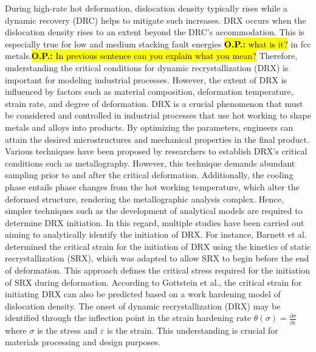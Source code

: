 \documentclass[metals,article,submit,pdftex,moreauthors]{Definitions/mdpi}
\makeatletter
\DeclareRobustCommand{\eal}{et al.\@\xspace}
\DeclareRobustCommand{\OP}[1]{\begingroup\sethlcolor{VWyellow}\textcolor{red}{\hl{\textbf{O.P.:} #1}}\endgroup}
\DeclareRobustCommand{\OPP}[1]{\begingroup\sethlcolor{VWyellow}\textcolor{red}{\hl{\textbf{O.P.:} In previous sentence #1}}\endgroup}
\makeatother
\begin{document}
During high-rate hot deformation, dislocation density typically rises while a dynamic recovery (DRC) helps to mitigate such increases.
DRX occurs when the dislocation density rises to an extent beyond the DRC’s accommodation.
This is especially true for low and medium stacking fault energies \OP{what is it?} in fcc metals.\OPP{can you explain what you mean?}
Therefore, understanding the critical conditions for dynamic recrystallization (DRX) is important for modeling industrial processes.
However, the extent of DRX is influenced by factors such as material composition, deformation temperature, strain rate, and degree of deformation.
DRX is a crucial phenomenon that must be considered and controlled in industrial processes that use hot working to shape metals and alloys into products.
By optimizing the parameters, engineers can attain the desired microstructures and mechanical properties in the final product.
Various techniques have been proposed by researchers to establish DRX's critical conditions such as metallography.
However, this technique demands abundant sampling prior to and after the critical deformation.
Additionally, the cooling phase entails phase changes from the hot working temperature, which alter the deformed structure, rendering the metallographic analysis complex.
Hence, simpler techniques such as the development of analytical models are required to determine DRX initiation.
In this regard, multiple studies have been carried out aiming to analytically identify the initiation of DRX.
For instance, Barnett \eal \cite{barnett2000predicting} determined the critical strain for the initiation of DRX using the kinetics of static recrystallization (SRX), which was adapted to allow SRX to begin before the end of deformation.
This approach defines the critical stress required for the initiation of SRX during deformation.
According to Gottstein \eal \cite{gottstein2004prediction}, the critical strain for initiating DRX can also be predicted based on a work hardening model of dislocation density.
The onset of dynamic recrystallization (DRX) may be identified through the inflection point in the strain hardening rate $\theta(\sigma)=\frac{\partial \sigma}{\partial \varepsilon}$ where $\sigma$ is the stress and $\varepsilon$ is the strain.
This understanding is crucial for materials processing and design purposes.
\end{document}
